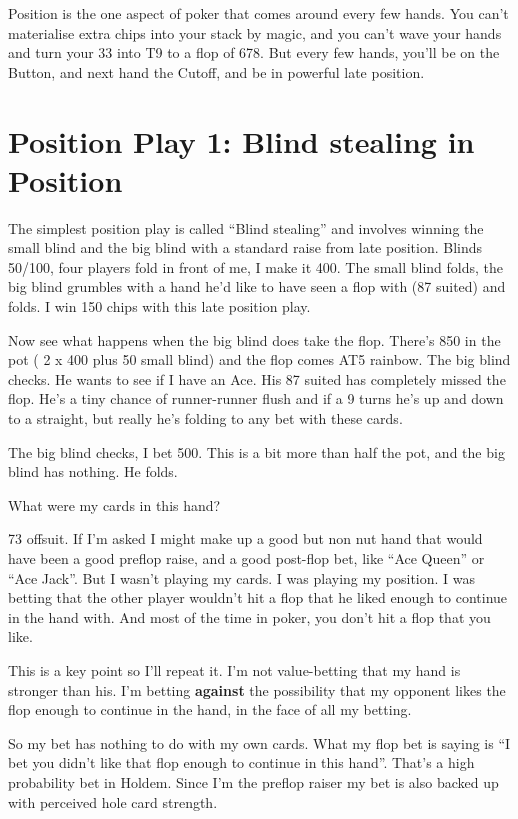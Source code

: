 Position is the one aspect of poker that comes around every few hands.
You can't materialise extra chips into your stack by magic, and you
can't wave your hands and turn your 33 into T9 to a flop of 678.
But every few hands, you'll be on the Button, and next hand the Cutoff,
and be in powerful late position.

\section{Position Play 1: Blind stealing in Position}

The simplest position play is called ``Blind stealing'' and involves
winning the small blind and the big blind with a
standard raise from late position. Blinds 50/100, four players fold in
front of me, I make it 400. The small blind folds, the big
blind grumbles with a hand he'd like to have seen a flop with
(87 suited) and folds. I win 150 chips with this late position play.

Now see what happens when the big blind does take the flop. There's
850 in the pot ( 2 x 400 plus 50 small blind) and the flop comes AT5
rainbow. The big blind checks. He wants to see if I have an Ace.
His 87 suited has completely missed the flop. He's a tiny
chance of runner-runner flush and if a 9 turns he's up and down
to a straight, but really he's folding to any bet with these cards.

The big blind checks, I bet 500. This is a bit more than half
the pot, and the big blind has nothing. He folds.

What were my cards in this hand?

73 offsuit. If I'm asked I might make up a good but non nut
hand that would have been a good preflop raise, and a good post-flop bet,
like ``Ace Queen'' or ``Ace Jack''. But I wasn't playing my cards. I was
playing my position. I was betting that the other player wouldn't hit a flop
that he liked enough to continue in the hand with. And most of the time
in poker, you don't hit a flop that you like.

This is a key point so I'll repeat it. I'm not value-betting that my hand is
stronger than his. I'm betting \textbf{against} the possibility
that my opponent likes the flop enough to continue in the hand, in the
face of all my betting.

So my bet has nothing to do with my own cards. What my
flop bet is saying is ``I bet you didn't like that flop enough to
continue in this hand''. That's a high probability bet in Holdem. Since I'm
the preflop raiser my bet is also backed up with perceived hole card
strength.

